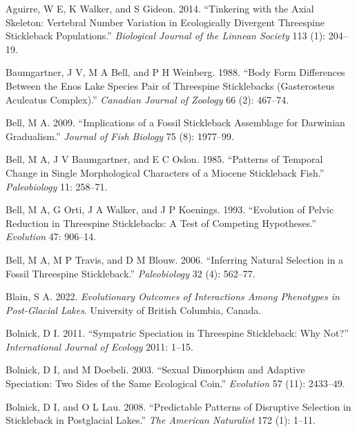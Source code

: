\documentclass[
  12pt,
]{article}
\newlength{\cslhangindent}
\newlength{\cslentryspacingunit} %
\newenvironment{CSLReferences}[2] %
 {%
  \setlength{\parindent}{0pt}
  \ifodd #1
  \let\oldpar\par
  \def\par{\hangindent=\cslhangindent\oldpar}
  \fi
  \setlength{\parskip}{#2\cslentryspacingunit}
 }%
 {}
\begin{document}
\hypertarget{refs}{}
\begin{CSLReferences}{1}{0}
\leavevmode{}%
Aguirre, W E, K Walker, and S Gideon. 2014. {``Tinkering with the Axial
Skeleton: Vertebral Number Variation in Ecologically Divergent
Threespine Stickleback Populations.''} \emph{Biological Journal of the
Linnean Society} 113 (1): 204--19.

\leavevmode{}%
Baumgartner, J V, M A Bell, and P H Weinberg. 1988. {``Body Form
Differences Between the Enos Lake Species Pair of Threespine
Sticklebacks (Gasterosteus Aculeatus Complex).''} \emph{Canadian Journal
of Zoology} 66 (2): 467--74.

\leavevmode{}%
Bell, M A. 2009. {``Implications of a Fossil Stickleback Assemblage for
Darwinian Gradualism.''} \emph{Journal of Fish Biology} 75 (8):
1977--99.

\leavevmode{}%
Bell, M A, J V Baumgartner, and E C Oslon. 1985. {``Patterns of Temporal
Change in Single Morphological Characters of a Miocene Stickleback
Fish.''} \emph{Paleobiology} 11: 258--71.

\leavevmode{}%
Bell, M A, G Orti, J A Walker, and J P Koenings. 1993. {``Evolution of
Pelvic Reduction in Threespine Sticklebacks: A Test of Competing
Hypotheses.''} \emph{Evolution} 47: 906--14.

\leavevmode{}%
Bell, M A, M P Travis, and D M Blouw. 2006. {``Inferring Natural
Selection in a Fossil Threespine Stickleback.''} \emph{Paleobiology} 32
(4): 562--77.

\leavevmode{}%
Blain, S A. 2022. \emph{Evolutionary Outcomes of Interactions Among
Phenotypes in Post-Glacial Lakes}. University of British Columbia,
Canada.

\leavevmode{}%
Bolnick, D I. 2011. {``Sympatric Speciation in Threespine Stickleback:
Why Not?''} \emph{International Journal of Ecology} 2011: 1--15.

\leavevmode{}%
Bolnick, D I, and M Doebeli. 2003. {``Sexual Dimorphism and Adaptive
Speciation: Two Sides of the Same Ecological Coin.''} \emph{Evolution}
57 (11): 2433--49.

\leavevmode{}%
Bolnick, D I, and O L Lau. 2008. {``Predictable Patterns of Disruptive
Selection in Stickleback in Postglacial Lakes.''} \emph{The American
Naturalist} 172 (1): 1--11.


\end{CSLReferences}
\end{document}
